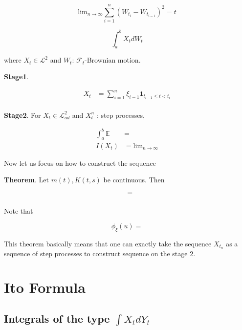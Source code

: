 \documentclass[12pt]{article}
\theoremstyle{nonumberbreak}
\begin{document}
$$
\mathrm{lim}_{n\to\infty} \sum_{i=1}^n \left( W_{t_i} - W_{t_{i-1}} \right)^2 = t
$$


$$
\int_a^b X_t dW_t
$$

where $X_t \in \mathcal{L}^2$ and $W_t$: $\mathcal{F}_t$-Brownian motion. 

\textbf{Stage1}. 

$$
\begin{aligned}
X_t &= \sum_{i=1}^n \xi_{i-1} \mathbf{1}_{t_{i-1} \le t < t_i} \\[8pt]
\end{aligned}
$$

\textbf{Stage2}. For $X_t \in \mathcal{L}^2_{ad}$ and $X_t^n$ : step processes,

$$
\begin{aligned}
\int_a^b \mathbb{E} &= \\[8pt]
I(X_t) &= \mathrm{lim}_{n\to\infty} 
\end{aligned}
$$


Now let us focus on how to construct the sequence 



\begin{theorem}
\textbf{Theorem}. Let $m(t), K(t,s)$ be continuous. Then 

$$
\begin{aligned}
 &= \\[8pt]
\end{aligned}
$$


Note that 

$$
\phi_\xi(u) = 
$$
\end{theorem}


This theorem basically means that one can exactly take the sequence $X_{t_n}$ as a sequence of step processes to construct sequence on the stage 2. 




\pagebreak
\section{Ito Formula}


\subsection{Integrals of the type $\int X_t d Y_t$}
\end{document}
